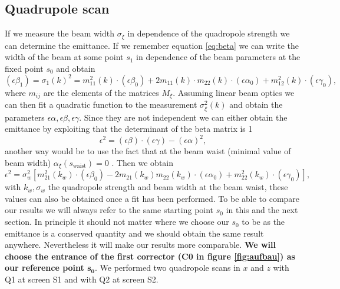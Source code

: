 \documentclass[11pt,a4paper,notitlepage]{scrartcl}
\begin{document}
\subsection{Quadrupole scan}
\label{subsec:qscan}
If we measure the beam width $\sigma_\xi$ in dependence of the quadropole strength we can determine the emittance. If we remember equation \ref{eq:beta} we can write the width of the beam at some point $s_1$ in dependence of the beam parameters at the fixed point $s_0$ and obtain
\begin{equation}
	(\epsilon \beta _1)=\sigma_1(k)^2=m_{11}^2(k)\cdot(\epsilon\beta_0)+2m_{11}(k)\cdot m_{22}(k)\cdot (\epsilon\alpha_0)+m_{12}^2(k)\cdot(\epsilon\gamma_0),
	\label{eq:qscan}
\end{equation}
where $m_{ij}$ are the elements of the matrices $M_\xi$. Assuming linear beam optics we can then fit a quadratic function to the measurement $\sigma_\xi^2(k)$ and obtain the parameters $\epsilon\alpha,\epsilon\beta,\epsilon\gamma$. Since they are not independent we can either obtain the emittance by exploiting that the determinant of the beta matrix is 1 \cite{script}
\begin{equation}
	\epsilon^2=(\epsilon\beta)\cdot(\epsilon\gamma)-(\epsilon\alpha)^2,
	\label{eq:det}
\end{equation}
another way would be to use the fact that at the beam waist (minimal value of beam width) $\alpha_\xi(s_\text{waist})=0$ \cite{wille}. Then we obtain \cite{script} \begin{equation}
	\epsilon^2=\sigma_w^2\left[m_{21}^2(k_w)\cdot(\epsilon\beta_0)-2m_{21}(k_w)m_{22}(k_w)\cdot(\epsilon\alpha_0)+m_{22}^2(k_w)\cdot(\epsilon\gamma_0)\right],
\end{equation}
with $k_w,\sigma_w$ the quadropole strength and beam width at the beam waist, these values can also be obtained once a fit has been performed. To be able to compare our results we will always refer to the same starting point $s_0$ in this and the next section. In principle it should not matter where we choose our $s_0$ to be as the emittance is a conserved quantity and we should obtain the same result anywhere. Nevertheless it will make our results more comparable. \textbf{We will choose the entrance of the first corrector (C0 in figure \ref{fig:aufbau}) as our reference point $\mathbf{ s_0}$}. We performed two quadropole scans in $x$ and $z$ with Q1 at screen S1 and with Q2 at screen S2.
\end{document}
